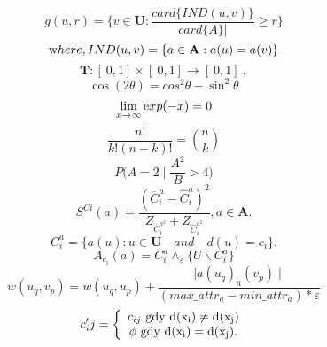 \documentclass[a4paper,12pt]{article}
\begin{document}
\newline
\begin{equation}
g(u,r)=\{ v\in \mathbf U :\frac{card\{IND(u,v)\}}{card\{A\}|}\geq r\}
\end{equation}
\newline
\begin{equation}
{\textrm where},IND(u,v)=\{a \in \mathbf A : a(u)=a(v)\}
\end{equation}
\newline
\begin{equation}
{\mathbf T}:[\ 0,1]\times [\ 0,1]\rightarrow [\ 0,1]\ ,
\end{equation}
\newline
\begin{equation}
\cos(2 \theta)=cos^2{\theta}-\sin^2{\theta}
\end{equation}
\newline
\begin{equation}
\lim_{x\rightarrow \infty} {\textrm exp}(-x)=0
\end{equation}
\newline
\begin{equation}
\frac{n!}{k!(n-k)!}={n \choose k}
\end{equation}
\newline
\begin{equation}
P\bigg ( A=2 \mid \frac{A^2}{B} >4 \bigg)
\end{equation}
\begin{equation}
S^{Ci}(a)=\frac{(\overline{C}^u_i - \hat{C}^a_i)^2}{Z_{\bar{C}^{a^2}_i}+Z_{\hat{C}^{a^2}_i}},a \in \mathbf A.
\end{equation}
\begin{equation}
C^a_i=\{a(u) : u \in \mathbf U \quad and \quad d(u)=c_i \}.
\end{equation}
\newline
\begin{equation}
A_{c_i}(a)=C_i^a \wedge_\varepsilon\{ U\backslash C^a_i \}
\end{equation}
\newline
\begin{equation}
w(u_q,v_p)=w(u_q,u_p) + \frac{\mid a(u_q)_a(v_p)\mid}{(max\_attr_a-min\_attr_a)\ast \varepsilon}
\end{equation}
\newline
\begin{equation}
c'_ij= \left \{
\begin{array}{c}
c_{ij} \rm \ gdy \ d(x_i) \neq d(x_j)\\
\phi \rm\ gdy \ d(x_i) = d(x_j).
\end{array} \right.
\end{equation}
\end{document}
